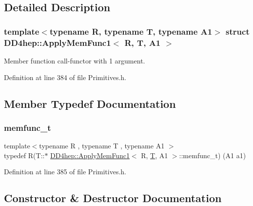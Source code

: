 \subsection{Detailed Description}
\subsubsection*{template$<$typename R, typename T, typename A1$>$\newline
struct D\+D4hep\+::\+Apply\+Mem\+Func1$<$ R, T, A1 $>$}

Member function call-\/functor with 1 argument. 

Definition at line 384 of file Primitives.\+h.



\subsection{Member Typedef Documentation}
\hypertarget{struct_d_d4hep_1_1_apply_mem_func1_a8d2f05f9fd623eebfcfa252c8102783c}{}\label{struct_d_d4hep_1_1_apply_mem_func1_a8d2f05f9fd623eebfcfa252c8102783c} 
\subsubsection{\texorpdfstring{memfunc\+\_\+t}{memfunc\_t}}
{\footnotesize\ttfamily template$<$typename R , typename T , typename A1 $>$ \\
typedef R(T\+::$\ast$ \hyperlink{struct_d_d4hep_1_1_apply_mem_func1}{D\+D4hep\+::\+Apply\+Mem\+Func1}$<$ R, \hyperlink{class_t}{T}, A1 $>$\+::memfunc\+\_\+t) (A1 a1)}



Definition at line 385 of file Primitives.\+h.



\subsection{Constructor \& Destructor Documentation}
\hypertarget{struct_d_d4hep_1_1_apply_mem_func1_aa912c5b5b164fd74df16143aa1b85140}{}\label{struct_d_d4hep_1_1_apply_mem_func1_aa912c5b5b164fd74df16143aa1b85140} 
